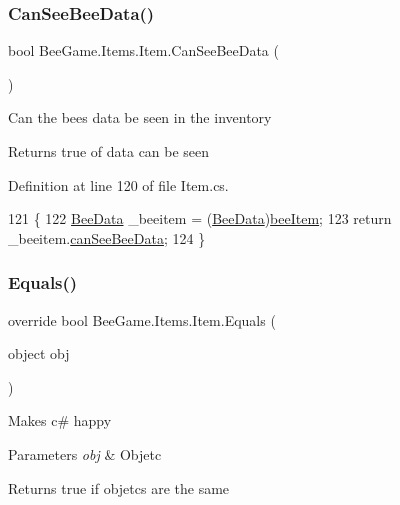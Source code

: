 \subsubsection{\texorpdfstring{Can\+See\+Bee\+Data()}{CanSeeBeeData()}}
{\footnotesize\ttfamily bool Bee\+Game.\+Items.\+Item.\+Can\+See\+Bee\+Data (\begin{DoxyParamCaption}{ }\end{DoxyParamCaption})}



Can the bees data be seen in the inventory 

\begin{DoxyReturn}{Returns}
true of data can be seen
\end{DoxyReturn}


Definition at line 120 of file Item.\+cs.


\begin{DoxyCode}
121         \{
122             \hyperlink{struct_bee_game_1_1_bee_1_1_bee_data}{BeeData} \_beeitem = (\hyperlink{struct_bee_game_1_1_bee_1_1_bee_data}{BeeData})\hyperlink{struct_bee_game_1_1_items_1_1_item_a0593f3b7b3ff5daa864f3c6d0ccd77ca}{beeItem};
123             \textcolor{keywordflow}{return} \_beeitem.\hyperlink{struct_bee_game_1_1_bee_1_1_bee_data_a9d7e31a11e286cf83d8b350557af42f7}{canSeeBeeData};
124         \}
\end{DoxyCode}
\mbox{\label{struct_bee_game_1_1_items_1_1_item_adb0ce56e232551efc18b4e4c6e3fc1ae}} 
\subsubsection{\texorpdfstring{Equals()}{Equals()}}
{\footnotesize\ttfamily override bool Bee\+Game.\+Items.\+Item.\+Equals (\begin{DoxyParamCaption}\item[{object}]{obj }\end{DoxyParamCaption})}



Makes c\# happy 


\begin{DoxyParams}{Parameters}
{\em obj} & Objetc\\
\hline
\end{DoxyParams}
\begin{DoxyReturn}{Returns}
true if objetcs are the same
\end{DoxyReturn}


